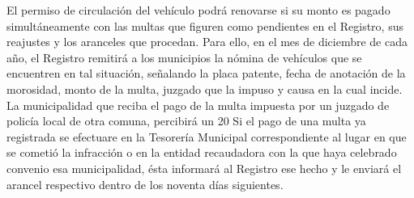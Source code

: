     El permiso de circulación del vehículo podrá renovarse si su monto es pagado simultáneamente con las multas que figuren como pendientes en el Registro, sus reajustes y los aranceles que procedan. Para ello, en el mes de diciembre de cada año, el Registro remitirá a los municipios la nómina de vehículos que se encuentren en tal situación, señalando la placa patente, fecha de anotación de la morosidad, monto de la multa, juzgado que la impuso y causa en la cual incide.
    La municipalidad que reciba el pago de la multa impuesta por un juzgado de policía local de otra comuna, percibirá un 20%
    Si el pago de una multa ya registrada se efectuare en la Tesorería Municipal correspondiente al lugar en que se cometió la infracción o en la entidad recaudadora con la que haya celebrado convenio esa municipalidad, ésta informará al Registro ese hecho y le enviará el arancel respectivo dentro de los noventa días siguientes.









